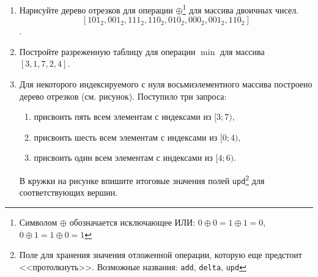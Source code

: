 \documentclass[a4paper,10pt]{article}
\begin{document}
  \begin{enumerate}
    \item Нарисуйте дерево отрезков для операции
      $\oplus$\footnote{Символом $\oplus$ обозначается исключающее ИЛИ:
      $0 \oplus 0 = 1 \oplus 1 = 0$, $0 \oplus 1 = 1 \oplus 0 = 1$}
      для массива двоичных чисел.
      $$[101_2, 001_2, 111_2, 110_2, 010_2, 000_2, 001_2, 110_2]$$.

      \vskip 3cm

    \item Постройте разреженную таблицу для операции $\min$
      для массива $[3, 1, 7, 2, 4]$.

      \vskip 3cm

    \item Для некоторого индексируемого с нуля восьмиэлементного
      массива построено дерево отрезков (см. рисунок).
      Поступило три запроса:
      \begin{enumerate} 
        \item присвоить пять всем элементам с индексами из $[3;7)$,
        \item присвоить шесть всем элементам с индексами из $[0;4)$,
        \item присвоить один всем элементам с индексами из $[4; 6)$.
      \end{enumerate}

      В кружки на рисунке впишите итоговые значения полей
      \texttt{upd}\footnote{Поле для хранения значения отложенной операции, которую еще
      предстоит <<протолкнуть>>. Возможные названия: \texttt{add}, \texttt{delta}, \texttt{upd}}
      для соответствующих вершин.

      \begin{center}
      \end{center}


\end{enumerate}
\end{document}
